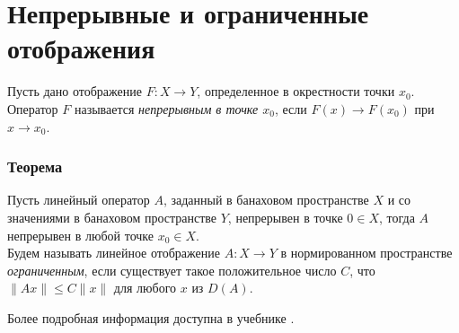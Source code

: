 \section{Непрерывные и ограниченные отображения}
\label{sec:q-9}
Пусть дано отображение $F : X \rightarrow Y$, определенное в окрестности точки $x_0$. Оператор $F$ называется \textit{непрерывным в точке $x_0$}, если $F(x)\rightarrow F(x_0)$ при $x \rightarrow x_0$.

\subsubsection*{Теорема}
Пусть линейный оператор $A$, заданный в банаховом пространстве $X$ и со значениями в банаховом пространстве $Y$, непрерывен в точке $0 \in X$, тогда $A$ непрерывен в любой точке $x_0 \in X$\cite[c.~112]{trenogin}.\\

Будем называть линейное отображение $A:X\to Y$ в нормированном пространстве \textit{ограниченным}, если существует такое положительное число $C$, что $\|Ax\| \leqslant C\|x\|$ для любого $x$ из $D(A)$.

Более подробная информация доступна в учебнике \cite[c.~112]{trenogin}.